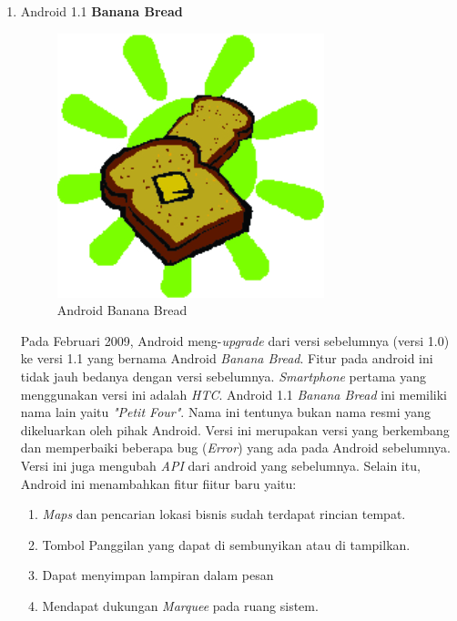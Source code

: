 \begin{enumerate}
\item Android 1.1 \textbf{Banana Bread}\\
\begin{figure}[!htbp]
    \centering
    \includegraphics[scale = 1.2]{pictures/android-banana-bread.jpg}
    \caption{Android Banana Bread}
    \label{}
\end{figure}

Pada Februari 2009, Android meng-\textit{upgrade} dari versi sebelumnya (versi 1.0) ke versi 1.1 yang bernama Android \textit{Banana Bread}. Fitur pada android ini tidak jauh bedanya dengan versi sebelumnya. \textit{Smartphone} pertama yang menggunakan versi ini adalah \textit{HTC}. Android 1.1 \textit{Banana Bread} ini memiliki nama lain yaitu \textit{"Petit Four"}. Nama ini tentunya bukan nama resmi yang dikeluarkan oleh pihak Android. Versi ini merupakan versi yang berkembang dan memperbaiki beberapa bug (\textit{Error}) yang ada pada Android sebelumnya. Versi ini juga mengubah \textit{API} dari android yang sebelumnya. Selain itu, Android ini menambahkan fitur fiitur baru yaitu:
\begin{enumerate}
    \item \textit{Maps} dan pencarian lokasi bisnis sudah terdapat rincian tempat.
    \item Tombol Panggilan yang dapat di sembunyikan atau di tampilkan.
    \item Dapat menyimpan lampiran dalam pesan
    \item Mendapat dukungan \textit{Marquee} pada ruang sistem.\\
\end{enumerate}



\end{enumerate}
